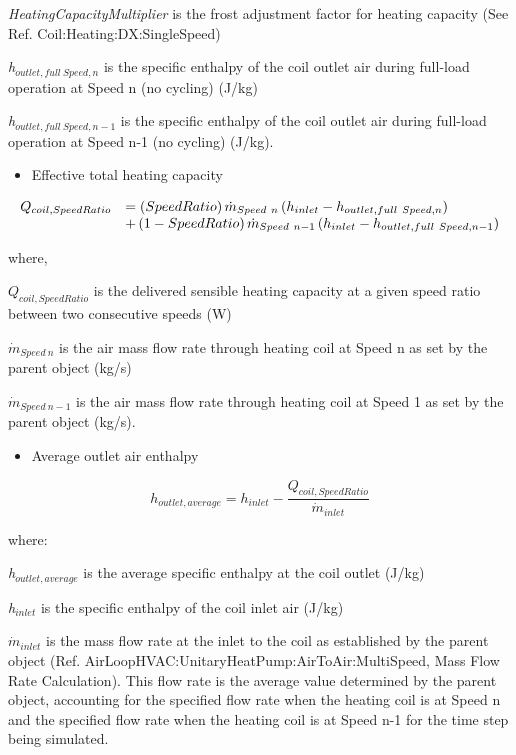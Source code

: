 \emph{HeatingCapacityMultiplier} is the frost adjustment factor for heating capacity (See Ref. Coil:Heating:DX:SingleSpeed)

\emph{h\(_{outlet,full~Speed,n}\)} is the specific enthalpy of the coil outlet air during full-load operation at Speed n (no cycling) (J/kg)

\emph{h\(_{outlet,full~Speed,n-1}\)} is the specific enthalpy of the coil outlet air during full-load operation at Speed n-1 (no cycling) (J/kg).

\begin{itemize}
  \item Effective total heating capacity
\end{itemize}

\begin{equation}
  \begin{array}{rl}
    Q_{coil,SpeedRatio} &= \left(SpeedRatio\right) \dot{m}_{Speed~n} \left(h_{inlet} - h_{outlet,full~Speed,n}\right) \\
                        &+ \left(1 - SpeedRatio\right) \dot{m}_{Speed~n - 1} \left(h_{inlet} - h_{outlet,full~Speed,n - 1}\right)
  \end{array}
\end{equation}

where,

\({{Q_{coil,SpeedRatio}}}\) is the delivered sensible heating capacity at a given speed ratio between two consecutive speeds (W)

\(\dot{m}_{Speed~n}\) is the air mass flow rate through heating coil at Speed n as set by the parent object (kg/s)

\(\dot{m}_{Speed~n-1}\) is the air mass flow rate through heating coil at Speed 1 as set by the parent object (kg/s).

\begin{itemize}
  \item Average outlet air enthalpy
\end{itemize}

\begin{equation}
  h_{outlet,average} = h_{inlet} - \frac{Q_{coil,SpeedRatio}}{\dot{m}_{inlet}}
\end{equation}

where:

\emph{h\(_{outlet,average}\)} is the average specific enthalpy at the coil outlet (J/kg)

\emph{h\(_{inlet}\)} is the specific enthalpy of the coil inlet air (J/kg)

\({\dot m_{inlet}}\) is the mass flow rate at the inlet to the coil as established by the parent object (Ref. AirLoopHVAC:UnitaryHeatPump:AirToAir:MultiSpeed, Mass Flow Rate Calculation). This flow rate is the average value determined by the parent object, accounting for the specified flow rate when the heating coil is at Speed n and the specified flow rate when the heating coil is at Speed n-1 for the time step being simulated.

